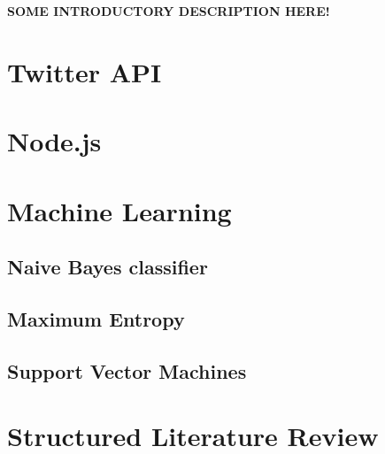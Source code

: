 \textbf{SOME INTRODUCTORY DESCRIPTION HERE!}

\section{Twitter API}


\section{Node.js}
	

\section{Machine Learning}
	\subsection{Naive Bayes classifier}
	
	
	\subsection{Maximum Entropy}
	
	
	\subsection{Support Vector Machines}
	

\section{Structured Literature Review}
